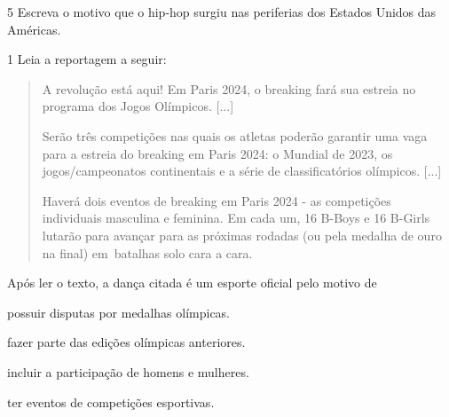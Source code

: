 \num{5} Escreva o motivo que o hip-hop surgiu nas periferias dos Estados Unidos das Américas.




\num{1} Leia a reportagem a seguir:

\begin{quote}
A revolução está aqui! Em Paris 2024,
o breaking fará sua
estreia no programa dos Jogos Olímpicos. {[}...{]}

Serão três competições nas quais os atletas poderão garantir uma vaga
para a estreia do breaking em Paris 2024: o Mundial de 2023, os
jogos/campeonatos continentais e a série de classificatórios olímpicos.
{[}...{]}

Haverá dois eventos de breaking em Paris 2024 - as competições
individuais masculina e feminina. Em cada um, 16 B-Boys e 16 B-Girls
lutarão para avançar para as próximas rodadas (ou pela medalha de ouro
na final) em~batalhas solo cara a cara.

\end{quote}

Após ler o texto, a dança citada é um esporte oficial pelo motivo de

\begin{escolha}
\item possuir disputas por medalhas olímpicas.

\item fazer parte das edições olímpicas anteriores.

\item incluir a participação de homens e mulheres.

\item ter eventos de competições esportivas.
\end{escolha}

